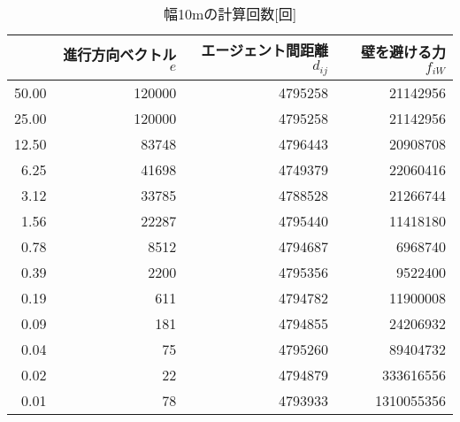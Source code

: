 \begin{table}[t]
  \centering
  \caption{幅10mの計算回数[回]}
  \label{tb:haba10_times}
  \begin{tabular}{r|r|r|r}
  \hline \hline
          & 進行方向ベクトル$e$ & エージェント間距離$d_{ij}$ & 壁を避ける力$f_{iW}$ \\ \hline
    50.00 & 120000 & 4795258 & 21142956 \\ \hline
    25.00 & 120000 & 4795258 & 21142956 \\ \hline
    12.50 & 83748 & 4796443 & 20908708 \\ \hline
    6.25 & 41698 & 4749379 & 22060416 \\ \hline
    3.12 & 33785 & 4788528 & 21266744 \\ \hline
    1.56 & 22287 & 4795440 & 11418180 \\ \hline
    0.78 & 8512 & 4794687 & 6968740 \\ \hline
    0.39 & 2200 & 4795356 & 9522400 \\ \hline
    0.19 & 611 & 4794782 & 11900008 \\ \hline
    0.09 & 181 & 4794855 & 24206932 \\ \hline
    0.04 & 75 & 4795260 & 89404732 \\ \hline
    0.02 & 22 & 4794879 & 333616556 \\ \hline
    0.01 & 78 & 4793933 & 1310055356 \\ \hline
  \end{tabular}
\end{table}


